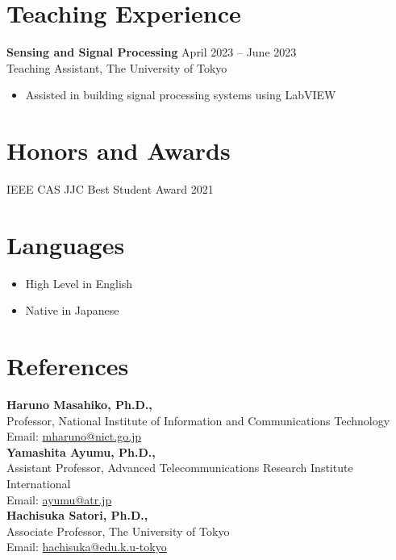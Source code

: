 \documentclass[letterpaper,10.5pt]{article}
\begin{document}
\section*{Teaching Experience}
\textbf{Sensing and Signal Processing} \hfill April 2023 -- June 2023 \\
Teaching Assistant, The University of Tokyo \\
\begin{itemize}
  \item Assisted in building signal processing systems using LabVIEW
\end{itemize}\vspace{5pt}
\section*{Honors and Awards}
IEEE CAS JJC Best Student Award \hfill 2021 \\ 
\section*{Languages}
\begin{itemize}[leftmargin=15pt]
  \item High Level in English
  \item Native in Japanese
\end{itemize}\vspace{5pt}
\section*{References}
\textbf{Haruno Masahiko, Ph.D.,} \\ 
Professor, National Institute of Information and Communications Technology \\ 
Email: \href{mailto:mharuno@nict.go.jp}{mharuno@nict.go.jp}\vspace{5pt} \\ 
\textbf{Yamashita Ayumu, Ph.D.,} \\ 
Assistant Professor, Advanced Telecommunications Research Institute International \\ 
Email: \href{mailto:ayumu@atr.jp}{ayumu@atr.jp}\vspace{5pt} \\ 
\textbf{Hachisuka Satori, Ph.D.,} \\ 
Associate Professor, The University of Tokyo \\ 
Email: \href{mailto:hachisuka@edu.k.u-tokyo}{hachisuka@edu.k.u-tokyo}\vspace{5pt} \\ 
\end{document}
